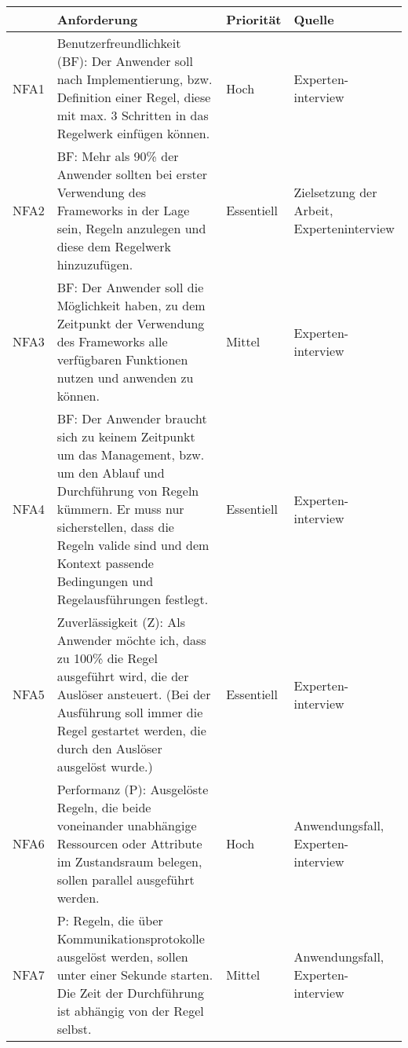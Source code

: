 \begin{table}[hbt!]
    \begin{center}
        \begin{tabular}{ | p{1.0cm} | p{9.7cm} | p{1.6cm} | p{2.6cm} | }
            \hline
                \textbf{} & \textbf{Anforderung} & \textbf{Priorität} & \textbf{Quelle} \\
            \hline
                NFA1 & Benutzerfreundlichkeit (BF): Der Anwender soll nach Implementierung, bzw. Definition einer Regel, diese mit max. 3 Schritten in das Regelwerk einfügen können. & Hoch & Experten-interview \\
            \hline
                NFA2 & BF: Mehr als 90\% der Anwender sollten bei erster Verwendung des Frameworks in der Lage sein, Regeln anzulegen und diese dem Regelwerk hinzuzufügen. & Essentiell & Zielsetzung der Arbeit, Experteninterview \\ 
            \hline
                NFA3 & BF: Der Anwender soll die Möglichkeit haben, zu dem Zeitpunkt der Verwendung des Frameworks alle verfügbaren Funktionen nutzen und anwenden zu können. & Mittel & Experten-interview \\ 
            \hline
                NFA4 & BF: Der Anwender braucht sich zu keinem Zeitpunkt um das Management, bzw. um den Ablauf und Durchführung von Regeln kümmern. Er muss nur sicherstellen, dass die Regeln valide sind und dem Kontext passende Bedingungen und Regelausführungen festlegt. & Essentiell & Experten-interview \\ 
            \hline
                NFA5 & Zuverlässigkeit (Z): Als Anwender möchte ich, dass zu 100\% die Regel ausgeführt wird, die der Auslöser ansteuert. (Bei der Ausführung soll immer die Regel gestartet werden, die durch den Auslöser ausgelöst wurde.) & Essentiell & Experten-interview \\
            \hline
                NFA6 & Performanz (P): Ausgelöste Regeln, die beide voneinander unabhängige Ressourcen oder Attribute im Zustandsraum belegen, sollen parallel ausgeführt werden. & Hoch & Anwendungsfall, Experten-interview \\ 
            \hline
                NFA7 & P: Regeln, die über Kommunikationsprotokolle ausgelöst werden, sollen unter einer Sekunde starten. Die Zeit der Durchführung ist abhängig von der Regel selbst. & Mittel & Anwendungsfall, Experten-interview \\ 

\end{tabular}
\end{center}
\end{table}
